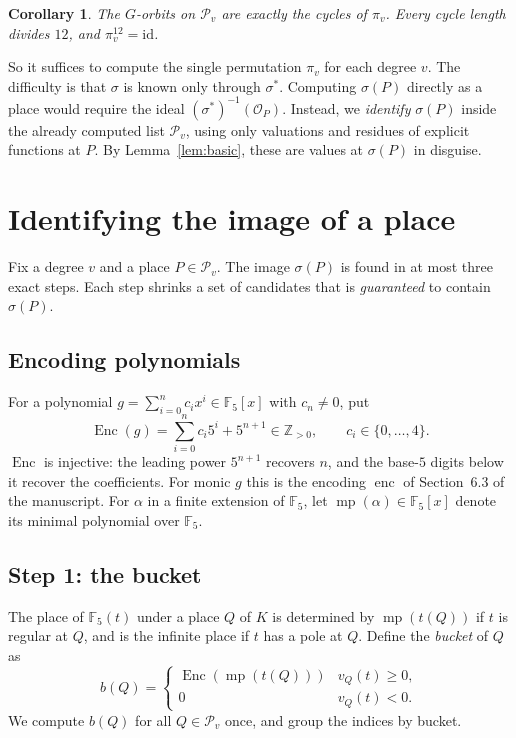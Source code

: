 \documentclass[11pt]{amsart}
\newtheorem{corollary}[theorem]{Corollary}
\theoremstyle{definition}
\theoremstyle{remark}
\newcommand{\F}{\mathbb{F}}
\newcommand{\Pl}{\mathcal{P}}
\newcommand{\minpoly}{\operatorname{mp}}
\newcommand{\Enc}{\operatorname{Enc}}
\begin{document}
\begin{corollary}\label{cor:cycles}
The $G$-orbits on $\Pl_v$ are exactly the cycles of $\pi_v$. Every cycle length divides $12$, and $\pi_v^{12}=\mathrm{id}$.
\end{corollary}

So it suffices to compute the single permutation $\pi_v$ for each degree $v$. The difficulty is that $\sigma$ is known only through $\sigma^*$. Computing $\sigma(P)$ directly as a place would require the ideal $(\sigma^*)^{-1}(\mathcal{O}_P)$. Instead, we \emph{identify} $\sigma(P)$ inside the already computed list $\Pl_v$, using only valuations and residues of explicit functions at $P$. By Lemma~\ref{lem:basic}, these are values at $\sigma(P)$ in disguise.

\section{Identifying the image of a place}

Fix a degree $v$ and a place $P\in\Pl_v$. The image $\sigma(P)$ is found in at most three exact steps. Each step shrinks a set of candidates that is \emph{guaranteed} to contain $\sigma(P)$.

\subsection{Encoding polynomials}
For a polynomial $g=\sum_{i=0}^{n}c_ix^i\in\F_5[x]$ with $c_n\neq0$, put
\[
\Enc(g)=\sum_{i=0}^{n}c_i5^i+5^{n+1}\in\mathbb{Z}_{>0},\qquad c_i\in\{0,\dots,4\}.
\]
$\Enc$ is injective: the leading power $5^{n+1}$ recovers $n$, and the base-$5$ digits below it recover the coefficients. For monic $g$ this is the encoding $\operatorname{enc}$ of Section~6.3 of the manuscript. For $\alpha$ in a finite extension of $\F_5$, let $\minpoly(\alpha)\in\F_5[x]$ denote its minimal polynomial over $\F_5$.

\subsection{Step 1: the bucket}
The place of $\F_5(t)$ under a place $Q$ of $K$ is determined by $\minpoly(t(Q))$ if $t$ is regular at $Q$, and is the infinite place if $t$ has a pole at $Q$. Define the \emph{bucket} of $Q$ as
\[
b(Q)=\begin{cases}\Enc(\minpoly(t(Q))) & v_Q(t)\ge0,\\ 0 & v_Q(t)<0.\end{cases}
\]
We compute $b(Q)$ for all $Q\in\Pl_v$ once, and group the indices by bucket.
\end{document}
